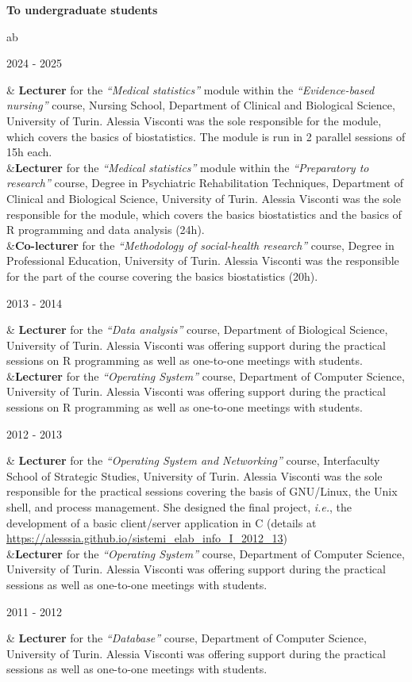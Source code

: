 \documentclass[a4paper,10pt]{article}
\newenvironment{singletablelist}
{	\vspace{-0.2cm}
	\begin{longtable}[!h]{ab}}{\end{longtable}
}
\newcommand{\stlist}[2]{
	\hspace{-3cm}
	\noindent
	\begin{minipage}{0.24\textwidth}
	\begin{flushright}
	\textsc{#1}
	\end{flushright}
	\end{minipage}
	& #2\\[0.2cm]
}
\begin{document}
\noindent \textbf{To undergraduate students}


\begin{singletablelist}
	
		
	\stlist{2024 - 2025}{\textbf{Lecturer} for the \emph{``Medical statistics''} module within the \emph{``Evidence-based nursing''} course, Nursing School, Department of Clinical and Biological Science, University of Turin. Alessia Visconti was the sole responsible for the module, which covers the basics of biostatistics. The module is run in 2 parallel sessions of 15h each.\\
							&\textbf{Lecturer} for the \emph{``Medical statistics''} module within the \emph{``Preparatory to research''} course, 
Degree in Psychiatric Rehabilitation Techniques, Department of Clinical and Biological Science, University of Turin. Alessia Visconti was the sole responsible for the module, which covers the basics biostatistics and the basics of R programming and data analysis (24h).\\
							&\textbf{Co-lecturer} for the \emph{``Methodology of social-health research''} course, Degree in Professional Education, University of Turin. Alessia Visconti was the responsible for the part of the course covering the basics biostatistics (20h).}
	
		
	\stlist{2013 - 2014}{\textbf{Lecturer} for the \emph{``Data analysis''} course, Department of Biological Science, University of Turin. Alessia Visconti was offering support during the practical sessions on R programming as well as one-to-one meetings with students. \\
							&\textbf{Lecturer} for the \emph{``Operating System''} course, Department of Computer Science, University of Turin. Alessia Visconti was offering support during the practical sessions on R programming as well as one-to-one meetings with students.}
	\stlist{2012 - 2013}{\textbf{Lecturer} for the \emph{``Operating System and Networking''} course, Interfaculty School of Strategic Studies, University of Turin. Alessia Visconti was the sole responsible for the practical sessions covering the basis of GNU/Linux, the Unix shell, and process management. She designed the final project, \emph{i.e.}, the development of a basic client/server application in C (details at \url{https://alesssia.github.io/sistemi_elab_info_I_2012_13})\\
							&\textbf{Lecturer} for the \emph{``Operating System''} course,  Department of Computer Science, University of Turin. Alessia Visconti was offering support during the practical sessions as well as one-to-one meetings with students. }
	\stlist{2011 - 2012}{\textbf{Lecturer} for the \emph{``Database''} course, Department of Computer Science, University of Turin. Alessia Visconti was offering support during the practical sessions as well as one-to-one meetings with students.}


\end{singletablelist}
\end{document}
